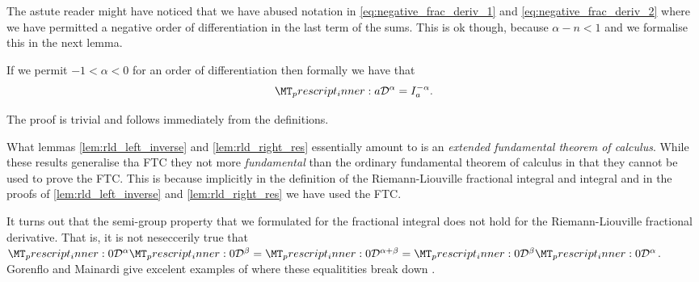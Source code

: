 The astute reader might have noticed that we have abused notation in \eqref{eq:negative_frac_deriv_1} and \eqref{eq:negative_frac_deriv_2} where we have permitted a negative order of differentiation in the last term of the sums. This is ok though, because $ \alpha - n < 1 $ and we formalise this in the next lemma. 
\begin{mdframed}[innertopmargin=10pt]
\begin{lemma}
    If we permit $ -1 < \alpha < 0 $ for an order of differentiation then formally we have that
    \begin{align}
        \prescript{}{a}{\mathcal{D}}^\alpha = I_a^{-\alpha}.
    \end{align}
\end{lemma}
\end{mdframed}
The proof is trivial and follows immediately from the definitions.

What lemmas \ref{lem:rld_left_inverse} and \ref{lem:rld_right_res} essentially amount to is an \emph{extended fundamental theorem of calculus}. While these results generalise tha FTC they not more \emph{fundamental} than the ordinary fundamental theorem of calculus in that they cannot be used to prove the FTC. This is because implicitly in the definition of the Riemann-Liouville fractional integral and integral and in the proofs of \ref{lem:rld_left_inverse} and \ref{lem:rld_right_res} we have used the FTC.

It turns out that the semi-group property that we formulated for the fractional integral does not hold for the Riemann-Liouville fractional derivative.
That is, it is not neseccerily true that $ \prescript{}{0}{\mathcal{D}}^\alpha \prescript{}{0}{\mathcal{D}}^\beta =  \prescript{}{0}{\mathcal{D}}^{\alpha + \beta} =  \prescript{}{0}{\mathcal{D}}^\beta  \prescript{}{0}{\mathcal{D}}^\alpha $. Gorenflo and Mainardi give excelent examples of where these equalitities break down \cite{Gorenflo1997}.

